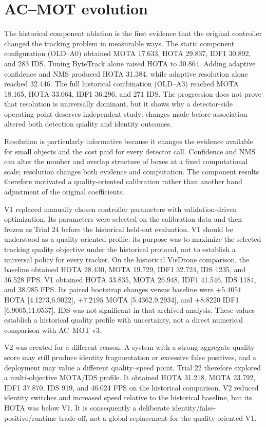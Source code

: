 \section{AC--MOT evolution}
The historical component ablation is the first evidence that the original controller changed the tracking problem in measurable ways. The static component configuration (OLD--A0) obtained MOTA 17.633, HOTA 29.837, IDF1 30.892, and 283 IDS. Tuning ByteTrack alone raised HOTA to 30.864. Adding adaptive confidence and NMS produced HOTA 31.384, while adaptive resolution alone reached 32.446. The full historical combination (OLD--A3) reached MOTA 18.165, HOTA 33.064, IDF1 36.296, and 271 IDS. The progression does not prove that resolution is universally dominant, but it shows why a detector-side operating point deserves independent study: changes made before association altered both detection quality and identity outcomes.

Resolution is particularly informative because it changes the evidence available for small objects and the cost paid for every detector call. Confidence and NMS can alter the number and overlap structure of boxes at a fixed computational scale; resolution changes both evidence and computation. The component results therefore motivated a quality-oriented calibration rather than another hand adjustment of the original coefficients.

V1 replaced manually chosen controller parameters with validation-driven optimization. Its parameters were selected on the calibration data and then frozen as Trial 24 before the historical held-out evaluation. V1 should be understood as a quality-oriented profile: its purpose was to maximize the selected tracking quality objective under the historical protocol, not to establish a universal policy for every tracker. On the historical VisDrone comparison, the baseline obtained HOTA 28.430, MOTA 19.729, IDF1 32.724, IDS 1235, and 36.528 FPS. V1 obtained HOTA 33.835, MOTA 26.948, IDF1 41.546, IDS 1184, and 38.985 FPS. Its paired bootstrap changes versus baseline were $+5.4051$ HOTA [4.1273,6.9022], $+7.2195$ MOTA [5.4362,9.2934], and $+8.8220$ IDF1 [6.9005,11.0537]. IDS was not significant in that archived analysis. These values establish a historical quality profile with uncertainty, not a direct numerical comparison with AC--MOT v3.

V2 was created for a different reason. A system with a strong aggregate quality score may still produce identity fragmentation or excessive false positives, and a deployment may value a different quality--speed point. Trial 22 therefore explored a multi-objective MOTA/IDS profile. It obtained HOTA 31.218, MOTA 23.792, IDF1 37.870, IDS 919, and 46.024 FPS on the historical comparison. V2 reduced identity switches and increased speed relative to the historical baseline, but its HOTA was below V1. It is consequently a deliberate identity/false-positive/runtime trade-off, not a global replacement for the quality-oriented V1.

